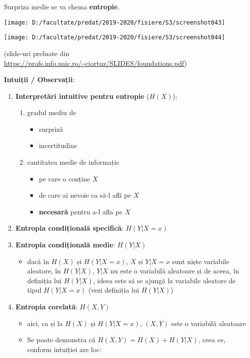 \documentclass[12pt]{article}
\begin{document}
	Surpriza medie se va chema \textbf{entropie}.
	\newpage
	\begin{center}
		\texttt{[image: D:/facultate/predat/2019-2020/fisiere/S3/screenshot043]}
	\end{center}
	
	\begin{center}
		\texttt{[image: D:/facultate/predat/2019-2020/fisiere/S3/screenshot044]}
	\end{center}
	(slide-uri preluate din \url{https://profs.info.uaic.ro/~ciortuz/SLIDES/foundations.pdf})
	
	\newpage
	
	\textbf{Intuiții / Observații}:
	\begin{enumerate}
		\item \textbf{Interpretări intuitive pentru entropie} ($H(X)$):
		\begin{enumerate}
			\item gradul mediu de
			\begin{itemize}
				\item surpriză
				\item incertitudine
			\end{itemize}
			\item cantitatea medie de informație
			\begin{itemize}
				\item pe care o conține $X$
				\item de care ai nevoie ca să-l afli pe $X$
				\item \textbf{necesară} pentru a-l afla pe $X$
			\end{itemize}
		\end{enumerate}
		\item \textbf{Entropia condițională specifică}: $H(Y|X=x)$
		\item \textbf{Entropia condițională medie}: $H(Y|X)$
		\begin{itemize}
			\item dacă în $H(X)$ și $H(Y|X=x)$, $X$ și $Y|X=x$ sunt niște variabile aleatore, în $H(Y|X)$, $Y|X$ nu este o variabilă aleatoare și de aceea, în definiția lui $H(Y|X)$, ideea este să se ajungă la variabile aleatore de tipul $H(Y|X=x)$ (vezi definiția lui $H(Y|X)$)
		\end{itemize}
		\item \textbf{Entropia corelată}: $H(X,Y)$
		\begin{itemize}
			\item aici, ca și la $H(X)$ și $H(Y|X=x)$, $(X,Y)$ este o variabilă aleatoare
			\item Se poate demonstra că $H(X,Y) = H(X) + H(Y|X)$, ceea ce, conform intuiției are loc:
			

\end{itemize}
\end{enumerate}
\end{document}
